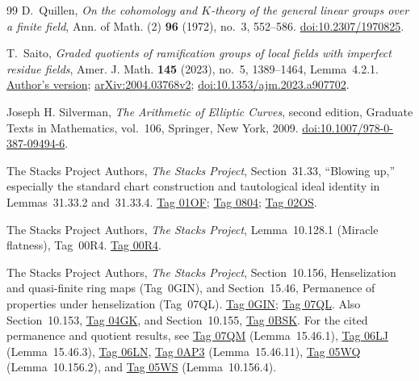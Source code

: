 \begin{thebibliography}{99}
D.~Quillen, \emph{On the cohomology and \(K\)-theory of the general
linear groups over a finite field}, Ann. of Math. (2)
\textbf{96} (1972), no.~3, 552--586.
\href{https://doi.org/10.2307/1970825}{doi:10.2307/1970825}.

T.~Saito, \emph{Graded quotients of ramification groups of local fields with imperfect residue fields}, Amer. J. Math. \textbf{145} (2023), no.~5, 1389--1464, Lemma~4.2.1.
\href{https://preprint.press.jhu.edu/ajm/sites/default/files/AJM-saito.pdf}{Author's version};
\href{https://arxiv.org/abs/2004.03768v2}{arXiv:2004.03768v2};
\href{https://doi.org/10.1353/ajm.2023.a907702}{doi:10.1353/ajm.2023.a907702}.

Joseph H. Silverman,
\emph{The Arithmetic of Elliptic Curves},
second edition, Graduate Texts in Mathematics, vol.~106,
Springer, New York, 2009.
\href{https://doi.org/10.1007/978-0-387-09494-6}{doi:10.1007/978-0-387-09494-6}.

The Stacks Project Authors, \emph{The Stacks Project}, Section~31.33, ``Blowing up,'' especially the standard chart construction and tautological ideal identity in Lemmas~31.33.2 and~31.33.4.
\href{https://stacks.math.columbia.edu/tag/01OF}{Tag 01OF};
\href{https://stacks.math.columbia.edu/tag/0804}{Tag 0804};
\href{https://stacks.math.columbia.edu/tag/02OS}{Tag 02OS}.

The Stacks Project Authors, \emph{The Stacks Project}, Lemma~10.128.1 (Miracle flatness), Tag~00R4.
\href{https://stacks.math.columbia.edu/tag/00R4}{Tag 00R4}.

The Stacks Project Authors, \emph{The Stacks Project}, Section~10.156, Henselization and quasi-finite ring maps (Tag~0GIN), and Section~15.46, Permanence of properties under henselization (Tag~07QL).
\href{https://stacks.math.columbia.edu/tag/0GIN}{Tag 0GIN}; \href{https://stacks.math.columbia.edu/tag/07QL}{Tag 07QL}. Also Section~10.153, \href{https://stacks.math.columbia.edu/tag/04GK}{Tag 04GK}, and Section~10.155, \href{https://stacks.math.columbia.edu/tag/0BSK}{Tag 0BSK}.
For the cited permanence and quotient results, see
\href{https://stacks.math.columbia.edu/tag/07QM}{Tag 07QM}
(Lemma~15.46.1),
\href{https://stacks.math.columbia.edu/tag/06LJ}{Tag 06LJ}
(Lemma~15.46.3),
\href{https://stacks.math.columbia.edu/tag/06LN}{Tag 06LN},
\href{https://stacks.math.columbia.edu/tag/0AP3}{Tag 0AP3}
(Lemma~15.46.11),
\href{https://stacks.math.columbia.edu/tag/05WQ}{Tag 05WQ}
(Lemma~10.156.2), and
\href{https://stacks.math.columbia.edu/tag/05WS}{Tag 05WS}
(Lemma~10.156.4).


\end{thebibliography}
